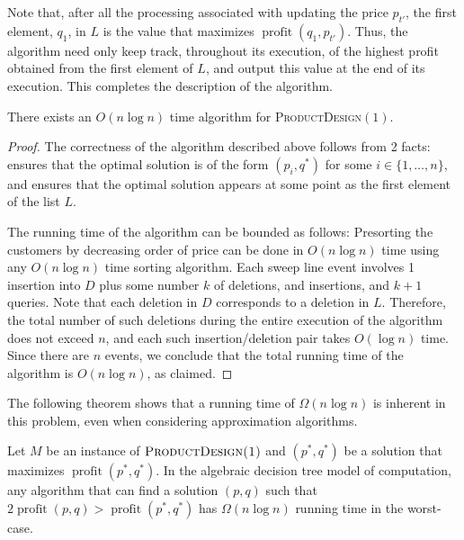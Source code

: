 \documentclass[lotsofwhite]{patmorin}
\newcommand{\val}{\operatorname{profit}}
\begin{document}
Note that, after all the processing associated with updating the price
$p_{t'}$, the first element, $q_1$, in $L$ is the value that maximizes
$\val(q_1,p_{t'})$. Thus, the algorithm need only keep track, throughout
its execution, of the highest profit obtained from the first element of
$L$, and output this value at the end of its execution.  This completes
the description of the algorithm.

\begin{thm}
  There exists an $O(n\log n)$ time algorithm for
  \textsc{ProductDesign$(1)$}.
\end{thm}

\begin{proof}
  The correctness of the algorithm described above follows from 2 facts:
   ensures that the optimal solution is of the form
  $(p_i,q^*)$ for some $i\in\{1,\ldots,n\}$, and 
  ensures that the optimal solution appears at some point as the first
  element of the list $L$.

  The running time of the algorithm can be bounded as follows: Presorting
  the customers by decreasing order of price can be done in $O(n\log n)$
  time using any $O(n\log n)$ time sorting algorithm. Each sweep line
  event involves 1 insertion into $D$ plus some number $k$ of deletions,
  and insertions, and $k+1$ queries.  Note that each deletion in $D$
  corresponds to a deletion in $L$.  Therefore, the total number of such
  deletions during the entire execution of the algorithm does not exceed
  $n$, and each such insertion/deletion pair takes $O(\log n)$ time.
  Since there are $n$ events, we conclude that the total running time
  of the algorithm is $O(n\log n)$, as claimed.
\end{proof}

The following theorem shows that a running time of $\Omega(n\log n)$
is inherent in this problem, even when considering approximation
algorithms.

\begin{thm}
  Let $M$ be an instance of $\textsc{ProductDesign(1)}$ and $(p^*,q^*)$
  be a solution that maximizes $\val(p^*,q^*)$.  In the algebraic decision
  tree model of computation, any algorithm that can find a solution
  $(p,q)$ such that $2 \val(p,q) > \val(p^*,q^*)$ has $\Omega(n\log n)$
  running time in the worst-case.
\end{thm}
\end{document}
